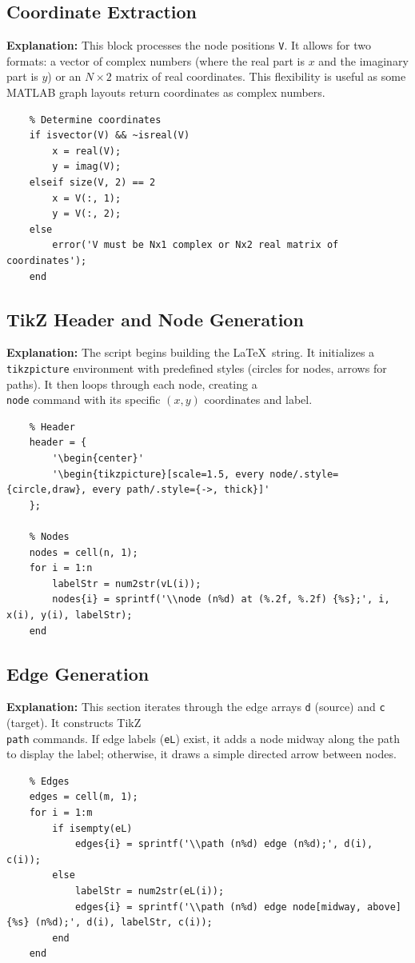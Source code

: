 \subsection{Coordinate Extraction}
\textbf{Explanation:} This block processes the node positions \texttt{V}. It allows for two formats: a vector of complex numbers (where the real part is $x$ and the imaginary part is $y$) or an $N \times 2$ matrix of real coordinates. This flexibility is useful as some MATLAB graph layouts return coordinates as complex numbers.
\begin{lstlisting}
    % Determine coordinates
    if isvector(V) && ~isreal(V)
        x = real(V);
        y = imag(V);
    elseif size(V, 2) == 2
        x = V(:, 1);
        y = V(:, 2);
    else
        error('V must be Nx1 complex or Nx2 real matrix of coordinates');
    end
\end{lstlisting}

\subsection{TikZ Header and Node Generation}
\textbf{Explanation:} The script begins building the \LaTeX\ string. It initializes a \texttt{tikzpicture} environment with predefined styles (circles for nodes, arrows for paths). It then loops through each node, creating a \texttt{\\node} command with its specific $(x, y)$ coordinates and label.
\begin{lstlisting}
    % Header
    header = {
        '\begin{center}'
        '\begin{tikzpicture}[scale=1.5, every node/.style={circle,draw}, every path/.style={->, thick}]'
    };

    % Nodes
    nodes = cell(n, 1);
    for i = 1:n
        labelStr = num2str(vL(i));
        nodes{i} = sprintf('\\node (n%d) at (%.2f, %.2f) {%s};', i, x(i), y(i), labelStr);
    end
\end{lstlisting}

\subsection{Edge Generation}
\textbf{Explanation:} This section iterates through the edge arrays \texttt{d} (source) and \texttt{c} (target). It constructs TikZ \texttt{\\path} commands. If edge labels (\texttt{eL}) exist, it adds a node midway along the path to display the label; otherwise, it draws a simple directed arrow between nodes.
\begin{lstlisting}
    % Edges
    edges = cell(m, 1);
    for i = 1:m
        if isempty(eL)
            edges{i} = sprintf('\\path (n%d) edge (n%d);', d(i), c(i));
        else
            labelStr = num2str(eL(i));
            edges{i} = sprintf('\\path (n%d) edge node[midway, above] {%s} (n%d);', d(i), labelStr, c(i));
        end
    end
\end{lstlisting}

